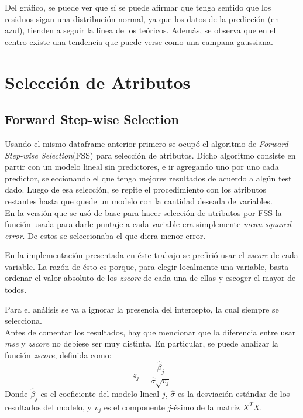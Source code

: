 \documentclass[letter, 10pt]{article}
\begin{document}
Del gráfico, se puede ver que sí se puede afirmar que tenga sentido que los residuos sigan una distribución normal, ya que los datos de la predicción (en azul), tienden a seguir la línea de los teóricos. Además, se observa que en el centro existe una tendencia que puede verse como una campana gaussiana.

\section{Selección de Atributos}

\subsection{Forward Step-wise Selection}

Usando el mismo dataframe anterior primero se ocupó el algoritmo de
\textit{Forward Step-wise Selection}(FSS) para selección de atributos. Dicho
algoritmo consiste en partir con un modelo lineal sin predictores, e ir
agregando uno por uno cada predictor, seleccionando el que tenga mejores
resultados de acuerdo a algún test dado. Luego de esa selección, se repite el
procedimiento con los atributos restantes hasta que quede un modelo con la
cantidad deseada de variables.\\

En la versión que se usó de base para hacer selección de atributos por FSS la
función usada para darle puntaje a cada variable era simplemente \textit{mean
  squared error}. De estos se seleccionaba el que diera menor error.

En la implementación presentada en éste trabajo se prefirió
usar el \textit{zscore} de cada variable. La razón de ésto es porque, para
elegir localmente una variable, basta ordenar el valor absoluto de los
\textit{zscore} de cada una de ellas y escoger el mayor de todos.

Para el análisis se va a ignorar la presencia del intercepto, la cual siempre se
selecciona.\\

Antes de comentar los resultados, hay que mencionar que la diferencia entre usar
\textit{mse} y \textit{zscore} no debiese ser muy distinta. En particular, se puede
analizar la función \textit{zscore}, definida como:
\begin{equation}
  z_j = \frac{\hat{\beta}_j}{\hat{\sigma}\sqrt{v_{j}}}
\end{equation}
Donde $\hat{\beta}_j$ es el coeficiente del modelo lineal $j$, $\hat{\sigma}$ es la
desviación estándar de los resultados del modelo, y $v_j$ es el componente
$j$-ésimo de la matriz $X^TX$.
\end{document}
